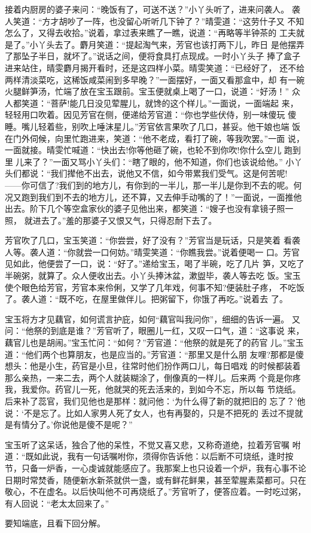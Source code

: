 接着内厨房的婆子来问：“晚饭有了，可送不送？”小丫头听了，进来问袭人。
袭人笑道：“方才胡吵了一阵，也没留心听听几下钟了？”晴雯道：“这劳什子又
不知怎么了，又得去收拾。”说着，拿过表来瞧了一瞧，说道：“再略等半钟茶的
工夫就是了。”小丫头去了。麝月笑道：“提起淘气来，芳官也该打两下儿，昨日
是他摆弄了那坠子半日，就坏了。”说话之间，便将食具打点现成。一时小丫头子
捧了盒子进来站住，晴雯麝月揭开看时，还是这四样小菜。晴雯笑道：“已经好了，
还不给两样清淡菜吃，这稀饭咸菜闹到多早晚？”一面摆好，一面又看那盒中，却
有一碗火腿鲜笋汤，忙端了放在宝玉跟前。宝玉便就桌上喝了一口，说道：“好汤！”
众人都笑道：“菩萨!能几日没见荤腥儿，就馋的这个样儿。”一面说，一面端起
来，轻轻用口吹着。因见芳官在侧，便递给芳官道：“你也学些伏侍，别一味傻玩
傻睡。嘴儿轻着些，别吹上唾沫星儿。”芳官依言果吹了几口，甚妥。他干娘也端
饭在门外伺候，向里忙跑进来，笑道：“他不老成，看打了碗，等我吹罢。”一面
说，一面就接。晴雯忙喊道：“快出去!你等他砸了碗，也轮不到你吹!你什么空儿
跑到里儿来了？”一面又骂小丫头们：“瞎了眼的，他不知道，你们也该说给他。”
小丫头们都说：“我们撵他不出去，说他又不信，如今带累我们受气。这是何苦呢!
——你可信了?我们到的地方儿，有你到的一半儿，那一半儿是你到不去的呢。何
况又跑到我们到不去的地方儿，还不算，又去伸手动嘴的了！”一面说，一面推他
出去。阶下几个等空盒家伙的婆子见他出来，都笑道：“嫂子也没有拿镜子照一照，
就进去了。”羞的那婆子又恨又气，只得忍耐下去了。

芳官吹了几口，宝玉笑道：“你尝尝，好了没有？”芳官当是玩话，只是笑着
看袭人等。袭人道：“你就尝一口何妨。”晴雯笑道：“你瞧我尝。”说着便喝一
口。芳官见如此，他便尝了一口，说：“好了。”递给宝玉，喝了半碗，吃了几片
笋，又吃了半碗粥，就算了。众人便收出去。小丫头捧沐盆，漱盥毕，袭人等去吃
饭。宝玉使个眼色给芳官，芳官本来伶俐，又学了几年戏，何事不知?便装肚子疼，
不吃饭了。袭人道：“既不吃，在屋里做伴儿。把粥留下，你饿了再吃。”说着去
了。

宝玉将方才见藕官，如何谎言护庇，如何“藕官叫我问你”，细细的告诉一遍。
又问：“他祭的到底是谁？”芳官听了，眼圈儿一红，又叹一口气，道：“这事说
来，藕官儿也是胡闹。”宝玉忙问：“如何？”芳官道：“他祭的就是死了的药官
儿。”宝玉道：“他们两个也算朋友，也是应当的。”芳官道：“那里又是什么朋
友哩?那都是傻想头：他是小生，药官是小旦，往常时他们扮作两口儿，每日唱戏
的时候都装着那么亲热，一来二去，两个人就装糊涂了，倒像真的一样儿。后来两
个竟是你疼我，我爱你。药官儿一死，他就哭的死去活来的，到如今不忘，所以每
节烧纸。后来补了蕊官，我们见他也是那样：就问他：‘为什么得了新的就把旧的
忘了？’他说：‘不是忘了。比如人家男人死了女人，也有再娶的，只是不把死的
丢过不提就是有情分了。’你说他是傻不是呢？”

宝玉听了这呆话，独合了他的呆性，不觉又喜又悲，又称奇道绝，拉着芳官嘱
咐道：“既如此说，我有一句话嘱咐你，须得你告诉他：以后断不可烧纸，逢时按
节，只备一炉香，一心虔诚就能感应了。我那案上也只设着一个炉，我有心事不论
日期时常焚香，随便新水新茶就供一盏，或有鲜花鲜果，甚至荤腥素菜都可。只在
敬心，不在虚名。以后快叫他不可再烧纸了。”芳官听了，便答应着。一时吃过粥，
有人回说：“老太太回来了。”

要知端底，且看下回分解。